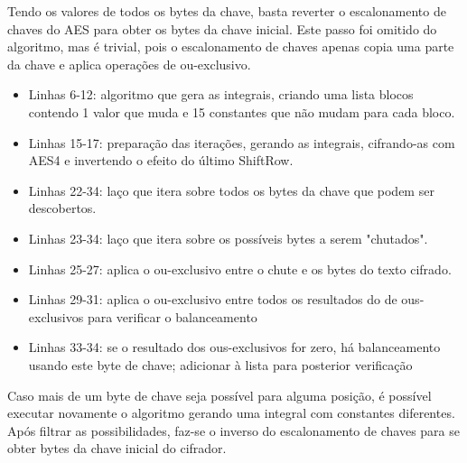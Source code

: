 \documentclass{article}
\begin{document}
Tendo os valores de todos os bytes da chave, basta reverter o escalonamento de chaves do AES para obter os bytes da chave inicial. Este passo foi omitido do algoritmo, mas é trivial, pois o escalonamento de chaves apenas copia uma parte da chave e aplica operações de ou-exclusivo.
\begin{itemize}

\item Linhas 6-12: algoritmo que gera as integrais, criando uma lista blocos contendo 1 valor que muda e 15 constantes que não mudam para cada bloco.
\item Linhas 15-17: preparação das iterações, gerando as integrais, cifrando-as com AES4 e invertendo o efeito do último ShiftRow.
\item Linhas 22-34: laço que itera sobre todos os bytes da chave que podem ser descobertos.
\item Linhas 23-34: laço que itera sobre os possíveis bytes a serem "chutados".
\item Linhas 25-27: aplica o ou-exclusivo entre o chute e os bytes do texto cifrado.
\item Linhas 29-31: aplica o ou-exclusivo entre todos os resultados do de ous-exclusivos para verificar o balanceamento
\item Linhas 33-34: se o resultado dos ous-exclusivos for zero, há balanceamento usando este byte de chave; adicionar à lista para posterior verificação
\end{itemize}
Caso mais de um byte de chave seja possível para alguma posição, é possível executar novamente o algoritmo gerando uma integral com constantes diferentes. Após filtrar as possibilidades, faz-se o inverso do escalonamento de chaves para se obter bytes da chave inicial do cifrador.
\end{document}
